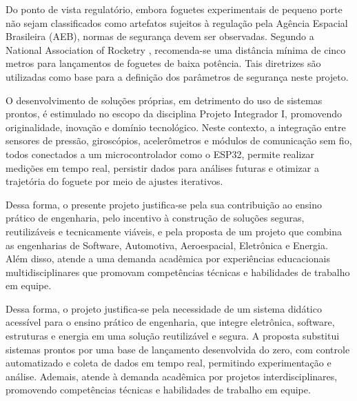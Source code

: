 Do ponto de vista regulatório, embora foguetes experimentais de pequeno porte não sejam classificados como artefatos sujeitos à regulação pela Agência Espacial Brasileira (AEB), normas de segurança devem ser observadas. Segundo a National Association of Rocketry  \cite{nar2012safety}, recomenda-se uma distância mínima de cinco metros para lançamentos de foguetes de baixa potência. Tais diretrizes são utilizadas como base para a definição dos parâmetros de segurança neste projeto.

O desenvolvimento de soluções próprias, em detrimento do uso de sistemas prontos, é estimulado no escopo da disciplina Projeto Integrador I, promovendo originalidade, inovação e domínio tecnológico. Neste contexto, a integração entre sensores de pressão, giroscópios, acelerômetros e módulos de comunicação sem fio, todos conectados a um microcontrolador como o ESP32, permite realizar medições em tempo real, persistir dados para análises futuras e otimizar a trajetória do foguete por meio de ajustes iterativos.

Dessa forma, o presente projeto justifica-se pela sua contribuição ao ensino prático de engenharia, pelo incentivo à construção de soluções seguras, reutilizáveis e tecnicamente viáveis, e pela proposta de um projeto que combina as engenharias de Software, Automotiva, Aeroespacial, Eletrônica e Energia. Além disso, atende a uma demanda acadêmica por experiências educacionais multidisciplinares que promovam competências técnicas e habilidades de trabalho em equipe.

Dessa forma, o projeto justifica-se pela necessidade de um sistema didático acessível para o ensino prático de engenharia, que integre eletrônica, software, estruturas e energia em uma solução reutilizável e segura. A proposta substitui sistemas prontos por uma base de lançamento desenvolvida do zero, com controle automatizado e coleta de dados em tempo real, permitindo experimentação e análise. Ademais, atende à demanda acadêmica por projetos interdisciplinares, promovendo competências técnicas e habilidades de trabalho em equipe.
